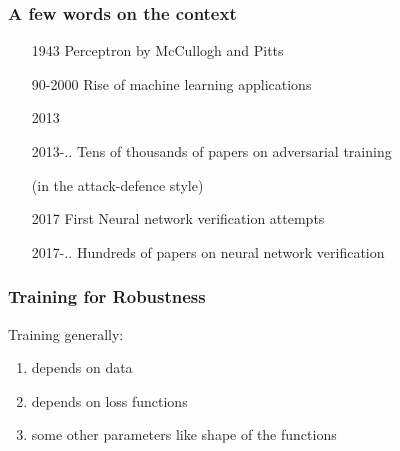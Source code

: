 \documentclass[t,compress,aspectratio=169]{beamer}
\begin{document}
\begin{frame}
  \frametitle{A few words on the context}
\vspace{-2em}
  \begin{itemize}
  \item[1943] Perceptron by McCullogh and Pitts
  \item[90-2000] Rise of machine learning applications
  \item[2013]
   {\scriptsize
 \begin{thebibliography}{99}
 \beamertemplatearticlebibitems
\end{thebibliography}}

\item[2013-..] Tens of thousands of papers on adversarial training

  (in the attack-defence style)
    {\scriptsize
 \begin{thebibliography}{99}
   \beamertemplatearticlebibitems
\end{thebibliography}}

\pause

\item[2017] First Neural network verification attempts
    {\scriptsize
 \begin{thebibliography}{99}
   \beamertemplatearticlebibitems
\end{thebibliography}}


\item[2017-..] Hundreds of papers on neural network verification

  \end{itemize}
\end{frame}




\begin{frame}
  \frametitle{Training for Robustness}
    Training generally:

    \begin{enumerate}
    \item depends on data
    \item depends on loss functions
      \item some other parameters like shape of the functions
      \end{enumerate}

\end{frame}
\end{document}
